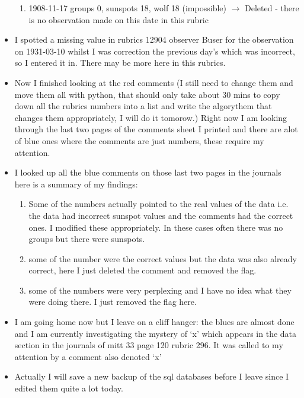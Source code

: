 \documentclass[12pt]{article}
\begin{document}
\begin{itemize}
\begin{enumerate}
        \item 1908-11-17 groups 0, sunspots 18, wolf 18 (impossible) $\to$ Deleted - there is no observation made on this date in this rubric
    \end{enumerate}
    \item I spotted a missing value in rubrics 12904 observer Buser for the observation on 1931-03-10 whilst I was correction the previous day's which was incorrect, so I entered it in. There may be more here in this rubrics.
    \item Now I finished looking at the red comments (I still need to change them and move them all with python, that should only take about 30 mins to copy down all the rubrics numbers into a list and write the algorythem that changes them appropriately, I will do it tomorow.) Right now I am looking through the last two pages of the comments sheet I printed and there are alot of blue ones where the comments are just numbers, these require my attention.
    \item I looked up all the blue comments on those last two pages in the journals here is a summary of my findings:
    \begin{enumerate}
        \item Some of the numbers actually pointed to the real values of the data i.e. the data had incorrect sunspot values and the comments had the correct ones. I modified these appropriately. In these cases often there was no groups but there were sunspots.
        \item some of the number were the correct values but the data was also already correct, here I just deleted the comment and removed the flag.
        \item some of the numbers were very perplexing and I have no idea what they were doing there. I just removed the flag here.
    \end{enumerate}
    \item I am going home now but I leave on a cliff hanger: the blues are almost done and I am currently investigating the mystery of `x' which appears in the data section in the journals of mitt 33 page 120 rubric 296. It was called to my attention by a comment also denoted `x'
    \item Actually I will save a new backup of the sql databases before I leave since I edited them quite a lot today.
    \end{itemize}
            
\end{document}
